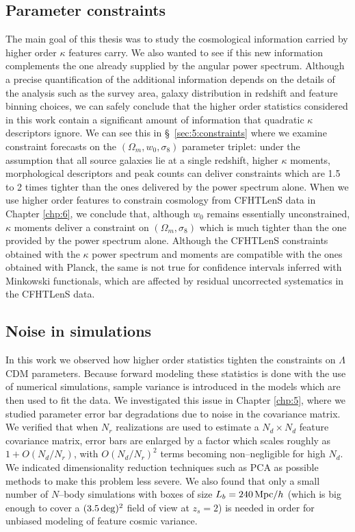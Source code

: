 \subsection{Parameter constraints}
The main goal of this thesis was to study the cosmological information carried by higher order $\kappa$ features carry. We also wanted to see if this new information complements the one already supplied by the angular power spectrum. Although a precise quantification of the additional information depends on the details of the analysis such as the survey area, galaxy distribution in redshift and feature binning choices, we can safely conclude that the higher order statistics considered in this work contain a significant amount of information that quadratic $\kappa$ descriptors ignore. We can see this in \S~\ref{sec:5:constraints} where we examine constraint forecasts on the $(\Omega_m,w_0,\sigma_8)$ parameter triplet: under the assumption that all source galaxies lie at a single redshift, higher $\kappa$ moments, morphological descriptors and peak counts can deliver constraints which are 1.5 to 2 times tighter than the ones delivered by the power spectrum alone. When we use higher order features to constrain cosmology from CFHTLenS data in Chapter \ref{chp:6}, we conclude that, although $w_0$ remains essentially unconstrained, $\kappa$ moments deliver a constraint on $(\Omega_m,\sigma_8)$ which is much tighter than the one provided by the power spectrum alone. Although the CFHTLenS constraints obtained with the $\kappa$ power spectrum and moments are compatible with the ones obtained with Planck, the same is not true for confidence intervals inferred with Minkowski functionals, which are affected by residual uncorrected systematics in the CFHTLenS data. 

\subsection{Noise in simulations}
In this work we observed how higher order statistics tighten the constraints on $\Lambda$CDM parameters. Because forward modeling these statistics is done with the use of numerical simulations, sample variance is introduced in the models which are then used to fit the data. We investigated this issue in Chapter \ref{chp:5}, where we studied parameter error bar degradations due to noise in the covariance matrix. We verified that when $N_r$ realizations are used to estimate a $N_d\times N_d$ feature covariance matrix, error bars are enlarged by a factor which scales roughly as  $1+O(N_d/N_r)$, with $O(N_d/N_r)^2$ terms becoming non--negligible for high $N_d$. We indicated dimensionality reduction techniques such as PCA as possible methods to make this problem less severe. We also found that only a small number of $N$--body simulations with boxes of size $L_b=240\,{\rm Mpc}/h$ (which is big enough to cover a $(3.5\,{\rm deg})^2$ field of view at $z_s=2$) is needed in order for unbiased modeling of feature cosmic variance.  

